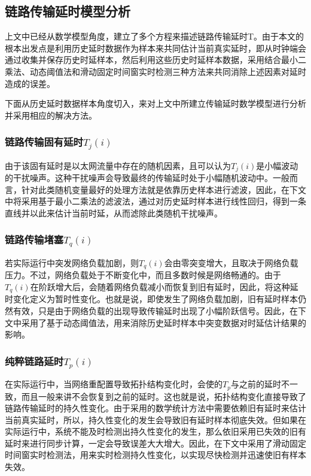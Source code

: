 \subsection{链路传输延时模型分析}
上文中已经从数学模型角度，建立了多个方程来描述链路传输延时T。由于本文的根本出发点是利用历史延时数据作为样本来共同估计当前真实延时，即从时钟端会通过收集并保存历史时延样本，然后利用这些历史时延样本数据，采用结合最小二乘法、动态阈值法和滑动固定时间窗实时检测三种方法来共同消除上述因素对延时造成的误差。

下面从历史延时数据样本角度切入，来对上文中所建立传输延时数学模型进行分析并采用相应的解决方法。

\subsubsection{链路传输固有延时$T_{j}(i)$}
由于该固有延时是以太网流量中存在的随机因素，且可以认为$T_{j}(i)$是小幅波动的干扰噪声。这种干扰噪声会导致最终的传输延时处于小幅随机波动中。一般而言，针对此类随机变量最好的处理方法就是依靠历史样本进行滤波，因此，在下文中将采用基于最小二乘法的滤波法，通过对历史延时样本进行线性回归，得到一条直线并以此来估计当前时延，从而滤除此类随机干扰噪声。

\subsubsection{链路传输堵塞$T_{q}(i)$}
若实际运行中突发网络负载加剧，则$T_{q}(i)$会由零突变增大，且取决于网络负载压力。不过，网络负载处于不断变化中，而且多数时候是网络畅通的。由于$T_{q}(i)$在阶跃增大后，会随着网络负载减小而恢复到旧有延时，因此，将这种延时变化定义为暂时性变化。也就是说，即使发生了网络负载加剧，旧有延时样本仍然有效，只是由于网络负载的出现导致传输延时出现了小幅阶跃信号。因此，在下文中采用了基于动态阈值法，用来消除历史延时样本中突变数据对时延估计结果的影响。

\subsubsection{纯粹链路延时$T_{p}(i)$}
在实际运行中，当网络重配置导致拓扑结构变化时，会使的$T_{p}$与之前的延时不一致，而且一般来讲不会恢复到之前的延时。这也就是说，拓扑结构变化直接导致了链路传输延时的持久性变化。由于采用的数学统计方法中需要依赖旧有延时来估计当前真实延时，所以，持久性变化的发生会导致旧有延时样本彻底失效。但如果在实际运行中，系统不能及时检测出持久性变化的发生，那么依旧采用已失效的旧有延时来进行同步计算，一定会导致误差大大增大。因此，在下文中采用了滑动固定时间窗实时检测法，用来实时检测持久性变化，以实现尽快检测并迅速使旧有样本失效。

